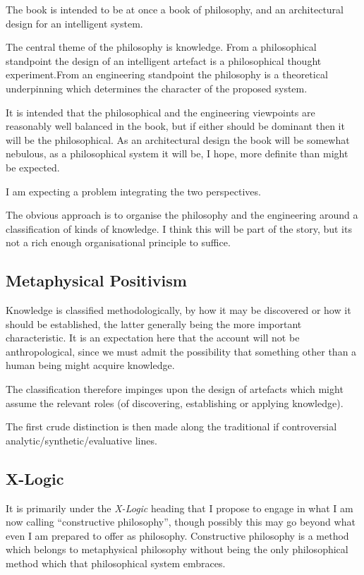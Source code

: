 \documentclass[numreferences]{rbjk}
\begin{document}
\begin{article}
The book is intended to be at once a book of philosophy, and an architectural design for an intelligent system.

The central theme of the philosophy is knowledge.
From a philosophical standpoint the design of an intelligent artefact is a philosophical thought experiment.From an engineering standpoint the philosophy is a theoretical underpinning which determines the character of the proposed system.

It is intended that the philosophical and the engineering viewpoints are reasonably well balanced in the book, but if either should be dominant then it will be the philosophical.
As an architectural design the book will be somewhat nebulous, as a philosophical system it will be, I hope, more definite than might be expected.

I am expecting a problem integrating the two perspectives.

The obvious approach is to organise the philosophy and the engineering around a classification of kinds of knowledge.
I think this will be part of the story, but its not a rich enough organisational principle to suffice.

\subsection{Metaphysical Positivism}

Knowledge is classified methodologically, by how it may be discovered or how it should be established, the latter generally being the more important characteristic.
It is an expectation here that the account will not be anthropological, since we must admit the possibility that something other than a human being might acquire knowledge.

The classification therefore impinges upon the design of artefacts which might assume the relevant roles (of discovering, establishing or applying knowledge).

The first crude distinction is then made along the traditional if controversial analytic/synthetic/evaluative lines.

\subsection{X-Logic}

It is primarily under the {\it X-Logic} heading that I propose to engage in what I am now calling ``constructive philosophy'', though possibly this may go beyond what even I am prepared to offer as philosophy.
Constructive philosophy is a method which belongs to metaphysical philosophy without being the only philosophical method which that philosophical system embraces.


\end{article}
\end{document}
